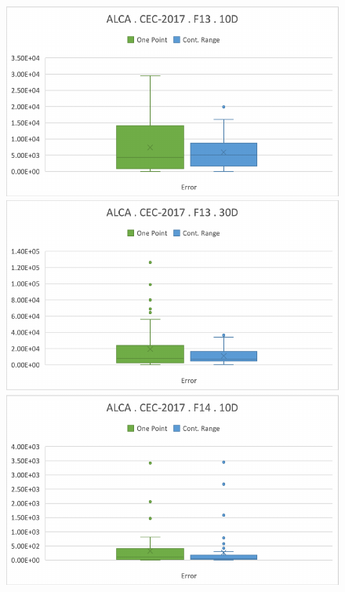 \documentclass[graybox]{svmult}
\begin{document}
\begin{figure}[!ht]
\begin{minipage}[h]{0.49\linewidth}
        \end{minipage}
        \vfill
        \vspace{0.05 cm}
        \begin{minipage}[h]{0.49\linewidth}
            \includegraphics[width=1\linewidth]{img/fig_experiment_F13x10D.pdf} 
        \end{minipage}
        \hfill
        \begin{minipage}[h]{0.49\linewidth}
            \includegraphics[width=1\linewidth]{img/fig_experiment_F13x30D.pdf} 
        \end{minipage}
        \vfill
        \vspace{0.05 cm}
        \begin{minipage}[h]{0.49\linewidth}
            \includegraphics[width=1\linewidth]{img/fig_experiment_F14x10D.pdf} 

\end{minipage}
\end{figure}
\end{document}

